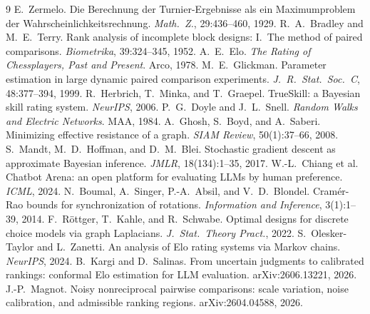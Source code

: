 \documentclass[11pt]{article}
\begin{document}
\begin{thebibliography}{9}
 E.~Zermelo.
Die Berechnung der Turnier-Ergebnisse als ein Maximumproblem der
Wahrscheinlichkeitsrechnung. \emph{Math.\ Z.}, 29:436--460, 1929.
 R.~A.~Bradley and M.~E.~Terry.
Rank analysis of incomplete block designs: I.\ The method of paired
comparisons. \emph{Biometrika}, 39:324--345, 1952.
 A.~E.~Elo.
\emph{The Rating of Chessplayers, Past and Present}. Arco, 1978.
 M.~E.~Glickman.
Parameter estimation in large dynamic paired comparison experiments.
\emph{J.\ R.\ Stat.\ Soc.\ C}, 48:377--394, 1999.
 R.~Herbrich, T.~Minka, and T.~Graepel.
TrueSkill: a Bayesian skill rating system. \emph{NeurIPS}, 2006.
 P.~G.~Doyle and J.~L.~Snell.
\emph{Random Walks and Electric Networks}. MAA, 1984.
 A.~Ghosh, S.~Boyd, and A.~Saberi.
Minimizing effective resistance of a graph. \emph{SIAM Review},
50(1):37--66, 2008.
 S.~Mandt, M.~D.~Hoffman, and D.~M.~Blei.
Stochastic gradient descent as approximate Bayesian inference.
\emph{JMLR}, 18(134):1--35, 2017.
 W.-L.~Chiang et al.
Chatbot Arena: an open platform for evaluating LLMs by human preference.
\emph{ICML}, 2024.
 N.~Boumal, A.~Singer, P.-A.~Absil, and V.~D.~Blondel.
Cram\'er-Rao bounds for synchronization of rotations.
\emph{Information and Inference}, 3(1):1--39, 2014.
 F.~R\"ottger, T.~Kahle, and R.~Schwabe.
Optimal designs for discrete choice models via graph Laplacians.
\emph{J.\ Stat.\ Theory Pract.}, 2022.
 S.~Olesker-Taylor and L.~Zanetti.
An analysis of Elo rating systems via Markov chains.
\emph{NeurIPS}, 2024.
 B.~Kargi and D.~Salinas.
From uncertain judgments to calibrated rankings: conformal Elo estimation
for LLM evaluation. arXiv:2606.13221, 2026.
 J.-P.~Magnot.
Noisy nonreciprocal pairwise comparisons: scale variation, noise
calibration, and admissible ranking regions. arXiv:2604.04588, 2026.
\end{thebibliography}
\end{document}
